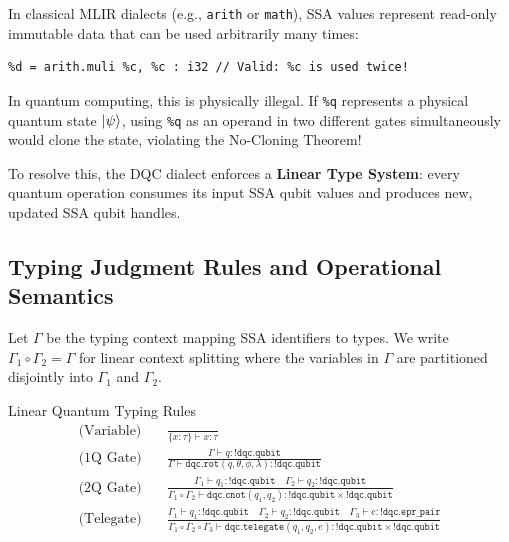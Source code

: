In classical MLIR dialects (e.g., \texttt{arith} or \texttt{math}), SSA values represent read-only immutable data that can be used arbitrarily many times:
\begin{lstlisting}[language=MLIR]
%c = arith.addi %a, %b : i32
%d = arith.muli %c, %c : i32 // Valid: %c is used twice!
\end{lstlisting}

In quantum computing, this is physically illegal. If \texttt{\%q} represents a physical quantum state $\ket{\psi}$, using \texttt{\%q} as an operand in two different gates simultaneously would clone the state, violating the No-Cloning Theorem!

To resolve this, the DQC dialect enforces a \textbf{Linear Type System}: every quantum operation consumes its input SSA qubit values and produces new, updated SSA qubit handles.

\subsection{Typing Judgment Rules and Operational Semantics}
Let $\Gamma$ be the typing context mapping SSA identifiers to types. We write $\Gamma_1 \circ \Gamma_2 = \Gamma$ for linear context splitting where the variables in $\Gamma$ are partitioned disjointly into $\Gamma_1$ and $\Gamma_2$.

\begin{definitionbox}{Linear Quantum Typing Rules}
\begin{align}
    \text{(Variable)} \quad & \frac{}{\{x : \tau\} \vdash x : \tau} \label{eq:type_var_ch07} \\[1ex]
    \text{(1Q Gate)} \quad & \frac{\Gamma \vdash q : \texttt{!dqc.qubit}}{\Gamma \vdash \texttt{dqc.rot}(q, \theta, \phi, \lambda) : \texttt{!dqc.qubit}} \label{eq:type_1q_ch07} \\[1ex]
    \text{(2Q Gate)} \quad & \frac{\Gamma_1 \vdash q_1 : \texttt{!dqc.qubit} \quad \Gamma_2 \vdash q_2 : \texttt{!dqc.qubit}}{\Gamma_1 \circ \Gamma_2 \vdash \texttt{dqc.cnot}(q_1, q_2) : \texttt{!dqc.qubit} \times \texttt{!dqc.qubit}} \label{eq:type_2q_ch07} \\[1ex]
    \text{(Telegate)} \quad & \frac{\Gamma_1 \vdash q_1 : \texttt{!dqc.qubit} \quad \Gamma_2 \vdash q_2 : \texttt{!dqc.qubit} \quad \Gamma_3 \vdash e : \texttt{!dqc.epr\_pair}}{\Gamma_1 \circ \Gamma_2 \circ \Gamma_3 \vdash \texttt{dqc.telegate}(q_1, q_2, e) : \texttt{!dqc.qubit} \times \texttt{!dqc.qubit}} \label{eq:type_telegate_ch07}
\end{align}
\end{definitionbox}

